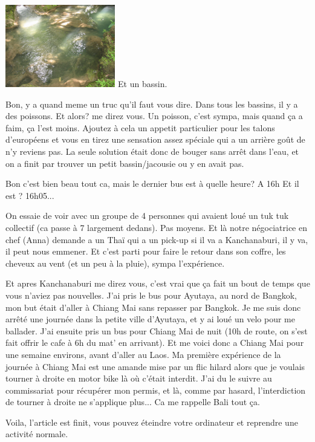 \begin{multicols}{2}
\hspace*{-0.65cm}
\includegraphics[width=4.8cm]{articles/Kanchanaburi/1438.jpg}
Et un bassin.

Bon, y a quand meme un truc qu'il faut vous dire. Dans tous les bassins, il y a des poissons. Et alors? me direz vous. Un poisson, c'est sympa, mais quand ça a faim, ça l'est moins. Ajoutez à cela un appetit particulier pour les talons d'européens et vous en tirez une sensation assez spéciale qui a un arrière goût de n'y reviens pas. La seule solution était donc de bouger sans arrêt dans l'eau, et on a finit par trouver un petit bassin/jacousie ou y en avait pas.

\begin{dialogue}
   Bon c'est bien beau tout ca, mais le dernier bus est à quelle heure?
   A 16h
   Et il est ?
   16h05...
\end{dialogue}

On essaie de voir avec un groupe de 4 personnes qui avaient loué un tuk tuk collectif (ca passe à 7 largement dedans). Pas moyens. Et là notre négociatrice en chef (Anna) demande a un Thaï qui a un pick-up si il va a Kanchanaburi, il y va, il peut nous emmener. Et c'est parti pour faire le retour dans son coffre, les cheveux au vent (et un peu à la pluie), sympa l'expérience.

Et apres Kanchanaburi me direz vous, c'est vrai que ça fait un bout de temps que vous n'aviez pas nouvelles. J'ai pris le bus pour Ayutaya, au nord de Bangkok, mon but était d'aller à Chiang Mai sans repasser par Bangkok. Je me suis donc arrêté une journée dans la petite ville d'Ayutaya, et y ai loué un velo pour me ballader. J'ai ensuite pris un bus pour Chiang Mai de nuit (10h de route, on s'est fait offrir le cafe à 6h du mat' en arrivant). Et me voici donc a Chiang Mai pour une semaine environs, avant d'aller au Laos. Ma première expérience de la journée à Chiang Mai est une amande mise par un flic hilard alors que je voulais tourner à droite en motor bike là où c'était interdit. J'ai du le suivre au commissariat pour récupérer mon permis, et là, comme par hasard, l'interdiction de tourner à droite ne s'applique plus... Ca me rappelle Bali tout ça.

Voila, l'article est finit, vous pouvez éteindre votre ordinateur et reprendre une activité normale.

\end{multicols}


